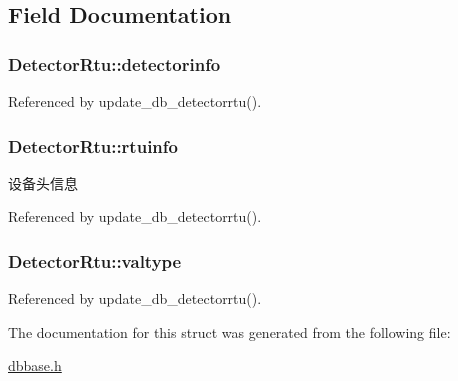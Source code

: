 \subsection{Field Documentation}
\hypertarget{structDetectorRtu_a2d98ee3ad1fe130208268ee868dc5dab}{
\subsubsection[{detectorinfo}]{ Detector\-Rtu\-::detectorinfo}}\label{structDetectorRtu_a2d98ee3ad1fe130208268ee868dc5dab}


Referenced by update\-\_\-db\-\_\-detectorrtu().

\hypertarget{structDetectorRtu_a0cc8bb5f4b4f63380fabd7d7e6c82849}{
\subsubsection[{rtuinfo}]{ Detector\-Rtu\-::rtuinfo}}\label{structDetectorRtu_a0cc8bb5f4b4f63380fabd7d7e6c82849}


设备头信息 



Referenced by update\-\_\-db\-\_\-detectorrtu().

\hypertarget{structDetectorRtu_a0b30b25acdbd4d7dc62ac9b50daf64f0}{
\subsubsection[{valtype}]{ Detector\-Rtu\-::valtype}}\label{structDetectorRtu_a0b30b25acdbd4d7dc62ac9b50daf64f0}


Referenced by update\-\_\-db\-\_\-detectorrtu().



The documentation for this struct was generated from the following file\-:\begin{DoxyCompactItemize}
\item 
\hyperlink{dbbase_8h}{dbbase.\-h}\end{DoxyCompactItemize}
